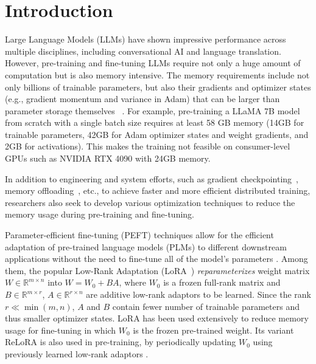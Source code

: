 
\vspace{-8mm}
\section{Introduction}
Large Language Models (LLMs) have shown impressive performance across multiple disciplines, including conversational AI and language translation.
However, pre-training and fine-tuning LLMs require not only a huge amount of computation but is also memory intensive. The memory requirements include not only billions of trainable parameters,  but also their gradients and optimizer states (e.g., gradient momentum and variance in Adam) that can be larger than parameter storage themselves  ~\citep{raffelExploringLimitsTransfer2023,touvronLlamaOpenFoundation2023,chowdheryPaLMScalingLanguage2022}. For example, pre-training a LLaMA 7B model from scratch with a single batch size requires at least 58 GB memory (14GB for trainable parameters, 42GB for Adam optimizer states and weight gradients, and 2GB for activations\protect\footnotemark[1]).
This makes the training not feasible on consumer-level GPUs such as NVIDIA RTX 4090 with 24GB memory.


In addition to engineering and system efforts, such as gradient checkpointing~\cite{chenTrainingDeepNets2016}, memory offloading~\cite{rajbhandariZeROMemoryOptimizations2020}, etc., to achieve faster and more efficient distributed training, researchers also seek to develop various optimization techniques to reduce the memory usage during pre-training and fine-tuning. 

\def\rr{\mathbb{R}}

Parameter-efficient fine-tuning (PEFT) techniques allow for the efficient adaptation of pre-trained language models (PLMs) to different downstream applications without the need to fine-tune all of the model's parameters \citep{dingDeltaTuningComprehensive2022}.
Among them, the popular Low-Rank Adaptation (LoRA~\citet{huLoRALowRankAdaptation2021}) \emph{reparameterizes} weight matrix $W\in \rr^{m\times n}$ into $W = W_0 + BA$, where $W_0$ is a frozen full-rank matrix and $B\in\rr^{m\times r}$, $A\in\rr^{r\times n}$ are additive low-rank adaptors to be learned. Since the rank $r \ll \min(m,n)$, $A$ and $B$ contain fewer number of trainable parameters and thus smaller optimizer states. LoRA has been used extensively to reduce memory usage for fine-tuning in which $W_0$ is the frozen pre-trained weight. Its variant ReLoRA is also used in pre-training, by periodically updating $W_0$ using previously learned low-rank adaptors \citep{lialinReLoRAHighRankTraining2023}.

